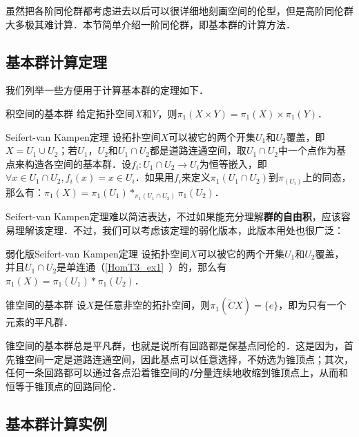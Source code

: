 

虽然把各阶同伦群都考虑进去以后可以很详细地刻画空间的伦型，但是高阶同伦群大多极其难计算．本节简单介绍一阶同伦群，即基本群的计算方法．

\subsection{基本群计算定理}

我们列举一些方便用于计算基本群的定理如下．

\begin{theorem}{积空间的基本群}
给定拓扑空间$X$和$Y$，则$\pi_1(X\times Y)=\pi_1(X)\times\pi_1(Y)$．
\end{theorem}

\begin{theorem}{Seifert-van Kampen定理}
设拓扑空间$X$可以被它的两个开集$U_1$和$U_2$覆盖，即$X=U_1\cup U_2$；若$U_1$，$U_2$和$U_1\cap U_2$都是道路连通空间，取$U_1\cap U_2$中一个点作为基点来构造各空间的基本群．设$f_i:U_1\cap U_2\rightarrow U_i$为恒等嵌入，即$\forall x\in U_1\cap U_2, f_i(x)=x\in U_i$．如果用$f_i$来定义$\pi_1(U_1\cap U_2)$到$\pi_(U_i)$上的同态，那么有：$\pi_1(X)=\pi_1(U_1)*_{\pi_1(U_1\cap U_2)}\pi_1(U_2)$．
\end{theorem}

Seifert-van Kampen定理难以简洁表达，不过如果能充分理解\textbf{群的自由积}，应该容易理解该定理．不过，我们可以考虑该定理的弱化版本，此版本用处也很广泛：

\begin{theorem}{弱化版Seifert-van Kampen定理}
设拓扑空间$X$可以被它的两个开集$U_1$和$U_2$覆盖，并且$U_1\cap U_2$是单连通（\autoref{HomT3_ex1}~）的，那么有$\pi_1(X)=\pi_1(U_1)*\pi_1(U_2)$．
\end{theorem}

\begin{theorem}{锥空间的基本群}
设$X$是任意非空的拓扑空间，则$\pi_1(\widetilde{C}X)=\{e\}$，即为只有一个元素的平凡群．
\end{theorem}

锥空间的基本群总是平凡群，也就是说所有回路都是保基点同伦的．这是因为，首先锥空间一定是道路连通空间，因此基点可以任意选择，不妨选为锥顶点；其次，任何一条回路都可以通过各点沿着锥空间的$I$分量连续地收缩到锥顶点上，从而和恒等于锥顶点的回路同伦．



\subsection{基本群计算实例}

